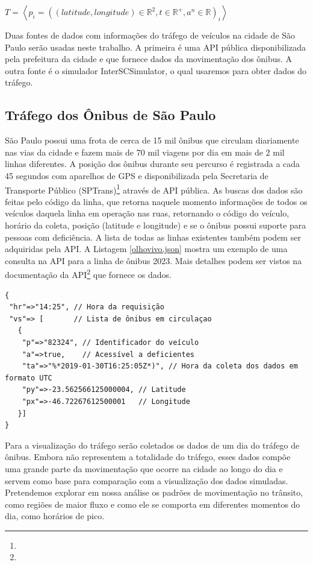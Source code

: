 \begin{center}
$T = \left\langle p_i = ((latitude, longitude) \in \mathbb{R}^2, t \in \mathbb{R}^+, a^n \in \mathbb{R})_i \right\rangle$
\end{center}

  Duas fontes de dados com informações do tráfego de veículos na cidade de São
Paulo serão usadas neste trabalho. A primeira é uma API pública disponibilizada
pela prefeitura da cidade e que fornece dados da movimentação dos ônibus. A
outra fonte é o simulador InterSCSimulator, o qual usaremos para obter dados
do tráfego.

\subsection{Tráfego dos Ônibus de São Paulo} São Paulo possui uma frota de
cerca de 15 mil ônibus que circulam diariamente nas vias da cidade e fazem mais
de 70 mil viagens por dia em mais de 2 mil linhas diferentes. A posição dos
ônibus durante seu percurso é registrada a cada 45 segundos com aparelhos de
GPS e disponibilizada pela Secretaria de Transporte Público
(SPTrans)\footnote{} através de API pública. As buscas
dos dados são feitas pelo código da linha, que retorna naquele momento
informações de todos os veículos daquela linha em operação nas ruas, retornando
o código do veículo, horário da coleta, posição (latitude e longitude) e se o
ônibus possui suporte para pessoas com deficiência. A lista de todas as linhas
existentes também podem ser adquiridas pela API.  A Listagem
\ref{olhovivo.json} mostra um exemplo de uma consulta na API para a linha de
ônibus 2023. Mais detalhes podem ser vistos na documentação da
API\footnote{}
que fornece os dados.

\begin{lstlisting}[style=myxml, caption={Parte da resposta obitida para a linha 2023}, label=olhovivo.json]
{
 "hr"=>"14:25", // Hora da requisição
 "vs"=> [       // Lista de ônibus em circulaçao
   {
    "p"=>"82324", // Identificador do veículo
    "a"=>true,    // Acessível a deficientes
    "ta"=>"%*2019-01-30T16:25:05Z*)", // Hora da coleta dos dados em formato UTC
    "py"=>-23.562566125000004, // Latitude
    "px"=>-46.72267612500001   // Longitude
   }]
}
\end{lstlisting}

Para a visualização do tráfego serão coletados os dados de um dia do tráfego de
ônibus. Embora não representem a totalidade do tráfego, esses dados compõe uma
grande parte da movimentação que ocorre na cidade ao longo do dia e servem como
base para comparação com a visualização dos dados simuladas. Pretendemos
explorar em nossa análise os padrões de movimentação no trânsito, como regiões
de maior fluxo e como ele se comporta em diferentes momentos do dia, como
horários de pico.

